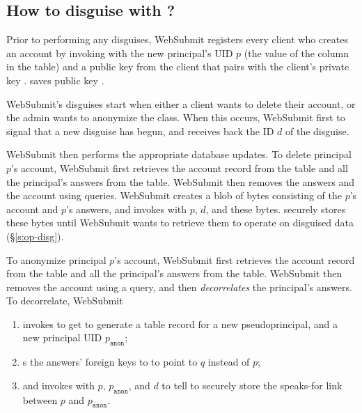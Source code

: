 \subsection{How to disguise with \sys?}

Prior to performing any disguises, WebSubmit registers every client who creates an account by
invoking  with the new principal's UID $p$ (the value of the  column in
the  table) and a public key  from the client that pairs with the client's private
key .  \sys saves public key .

WebSubmit's disguises start when either a client wants to delete their account, or the admin wants
to anonymize the class.
When this occurs, WebSubmit first  to signal \sys that a new disguise has begun,
and receives back the ID $d$ of the disguise.

WebSubmit then performs the appropriate database updates.  To delete principal $p$'s account,
WebSubmit first retrieves the account record from the  table and all the principal's
answers from the  table. WebSubmit then removes the answers and the account using
 queries.  WebSubmit creates a blob of bytes consisting of the $p$'s account and $p$'s
answers, and invokes  with $p$, $d$, and these bytes. \sys securely stores
these bytes until WebSubmit wants to retrieve them to operate on disguised data (\S\ref{s:op-disg}). 

To anonymize principal $p$'s account, WebSubmit first retrieves the account record from the 
table and all the principal's answers from the  table. WebSubmit then removes the
account using a  query, and then \emph{decorrelates} the principal's answers. 
To decorrelate, WebSubmit
\begin{enumerate}
%
\item invokes  to get \sys to generate a  table record for a new
    pseudoprincipal, and a new principal UID $p_{\texttt{anon}}$;
%
\item {}s the answers' foreign keys to  to point to $q$ instead of $p$;
%
\item and invokes  with $p$, $p_{\texttt{anon}}$, and $d$ to tell
    \sys to securely store the speaks-for link between $p$ and $p_{\texttt{anon}}$.
\end{enumerate}

